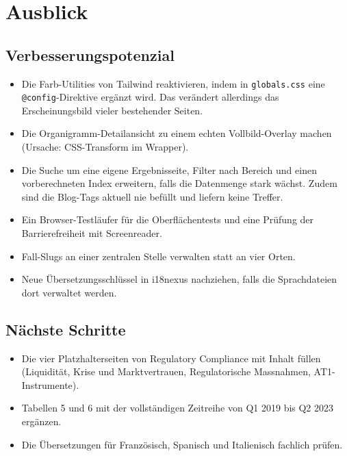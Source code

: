 \documentclass[11pt,a4paper]{article}
\let\oldsubsection\subsection
\renewcommand{\subsection}{\needspace{6\baselineskip}\oldsubsection}
\begin{document}
\section{Ausblick}

\subsection{Verbesserungspotenzial}
\begin{itemize}[nosep]
  \item Die Farb-Utilities von Tailwind reaktivieren, indem in \texttt{globals.css} eine \texttt{@config}-Direktive ergänzt wird. Das verändert allerdings das Erscheinungsbild vieler bestehender Seiten.
  \item Die Organigramm-Detailansicht zu einem echten Vollbild-Overlay machen (Ursache: CSS-Transform im Wrapper).
  \item Die Suche um eine eigene Ergebnisseite, Filter nach Bereich und einen vorberechneten Index erweitern, falls die Datenmenge stark wächst. Zudem sind die Blog-Tags aktuell nie befüllt und liefern keine Treffer.
  \item Ein Browser-Testläufer für die Oberflächentests und eine Prüfung der Barrierefreiheit mit Screenreader.
  \item Fall-Slugs an einer zentralen Stelle verwalten statt an vier Orten.
  \item Neue Übersetzungsschlüssel in i18nexus nachziehen, falls die Sprachdateien dort verwaltet werden.
\end{itemize}

\subsection{Nächste Schritte}
\begin{itemize}[nosep]
  \item Die vier Platzhalterseiten von Regulatory Compliance mit Inhalt füllen (Liquidität, Krise und Marktvertrauen, Regulatorische Massnahmen, AT1-Instrumente).
  \item Tabellen 5 und 6 mit der vollständigen Zeitreihe von Q1 2019 bis Q2 2023 ergänzen.
  \item Die Übersetzungen für Französisch, Spanisch und Italienisch fachlich prüfen.
\end{itemize}

\end{document}
